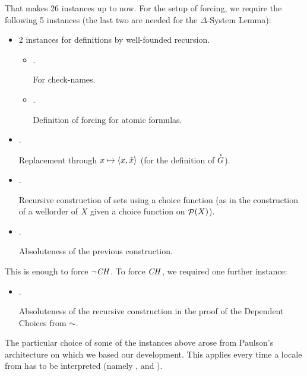 That makes 26 instances up to now. For the setup of forcing, we
require the following 5 instances (the last two are needed for the $\Delta$-System Lemma):

\begin{itemize}
\item 2 instances for definitions by well-founded recursion.
  \begin{itemize}
  \item {}.

    For check-names.
  \item {}.

    Definition of forcing for atomic formulas.
  \end{itemize}
\item
  .

  Replacement through $x\mapsto \langle x,\check{x}\rangle$ (for the
  definition of $\punto{G}$).
\item
  .

  Recursive construction of sets using a choice function (as in the
  construction of a wellorder of $X$ given a choice function on $\mathop{\mathcal{P}}(X)$).
\item
  .

  Absoluteness of the previous construction.
\end{itemize}
%
This is enough to force $\neg\mathit{CH}$. To force $\mathit{CH}$, we required one further instance:
%
\begin{itemize}
\item
  .

  Absoluteness of the recursive construction in the proof of the
  Dependent Choices from $\AC$.
\end{itemize}

The particular choice of some of the instances above arose from
Paulson's architecture on which we based our development.
This applies every time
a locale from  has to be
interpreted (namely 
, and ).

